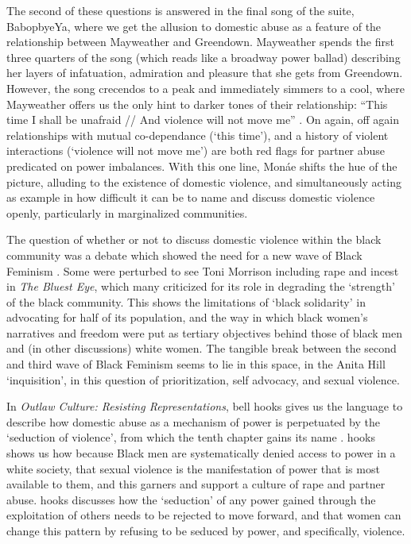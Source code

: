 \documentclass[a4paper, 11pt]{article} %
\begin{document}
The second of these questions is answered in the final song of the suite, BabopbyeYa, where we get the allusion to domestic abuse as a feature of the relationship between Mayweather and Greendown.
Mayweather spends the first three quarters of the song (which reads like a broadway power ballad) describing her layers of infatuation, admiration and pleasure that she gets from Greendown.
However, the song crecendos to a peak and immediately simmers to a cool, where Mayweather offers us the only hint to darker tones of their relationship: ``This time I shall be unafraid // And violence will not move me'' .
On again, off again relationships with mutual co-dependance (`this time'), and a history of violent interactions (`violence will not move me') are both red flags for partner abuse predicated on power imbalances.
With this one line, Mon\'ae shifts the hue of the picture, alluding to the existence of domestic violence, and simultaneously acting as example in how difficult it can be to name and discuss domestic violence openly, particularly in marginalized communities.

The question of whether or not to discuss domestic violence within the black community was a debate which showed the need for a new wave of Black Feminism .
Some were perturbed to see Toni Morrison including rape and incest in \emph{The Bluest Eye}, which many criticized for its role in degrading the `strength' of the black community.
This shows the limitations of `black solidarity' in advocating for half of its population, and the way in which black women's narratives and freedom were put as tertiary objectives behind those of black men and (in other discussions) white women.
The tangible break between the second and third wave of Black Feminism seems to lie in this space, in the Anita Hill `inquisition', in this question of prioritization, self advocacy, and sexual violence.

In \emph{Outlaw Culture: Resisting Representations}, bell hooks gives us the language to describe how domestic abuse as a mechanism of power is perpetuated by the `seduction of violence', from which the tenth chapter gains its name .
hooks shows us how because Black men are systematically denied access to power in a white society, that sexual violence is the manifestation of power that is most available to them, and this garners and support a culture of rape and partner abuse.
hooks discusses how the `seduction' of any power gained through the exploitation of others needs to be rejected to move forward, and that women can change this pattern by refusing to be seduced by power, and specifically, violence.
\end{document}
